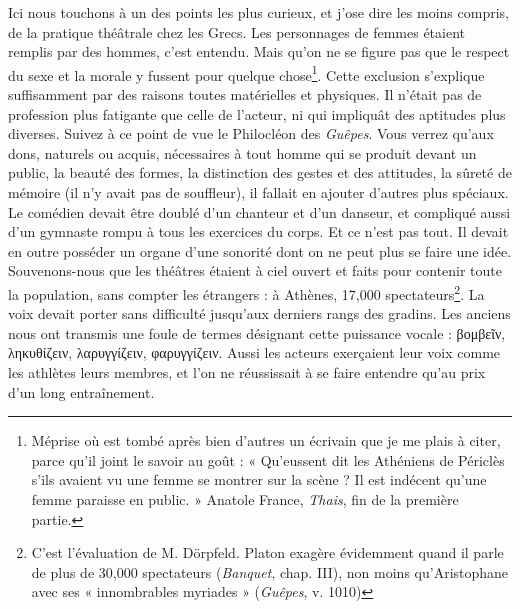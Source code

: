 \documentclass{book}%
\newcommand{\italique}[1]{\textit{#1}}%
\newcommand{\note}[1]{\footnote{#1}}
\begin{document}
Ici nous touchons à un des points les plus curieux, et j'ose dire les moins compris, de la pratique théâtrale chez les Grecs. Les personnages de femmes étaient remplis par des hommes, c'est entendu. Mais qu'on ne se figure pas que le respect du sexe et la morale y fussent pour quelque chose\note{Méprise où est tombé après bien d'autres un écrivain que je me plais à citer, parce qu'il joint le savoir au goût : « Qu'eussent dit les Athéniens de Périclès s'ils avaient vu une femme se montrer sur la scène ? Il est indécent qu'une femme paraisse en public. » Anatole France, \italique{Thais}, fin de la première partie.}. 
Cette exclusion s'explique suffisamment par des raisons toutes matérielles et physiques. Il n'était pas de profession plus fatigante que celle de l'acteur, ni qui impliquât des aptitudes plus diverses. 
Suivez à ce point de vue le Philocléon des \italique{Guêpes}. Vous verrez qu'aux dons, naturels ou acquis, nécessaires à tout homme qui se produit devant un public, la beauté des formes, la distinction des gestes et des attitudes, la sûreté de mémoire (il n'y avait pas de souffleur), il fallait en ajouter d'autres plus spéciaux. 
Le comédien devait être doublé d'un chanteur et d'un danseur, et compliqué aussi d'un gymnaste rompu à tous les exercices du corps. 
Et ce n'est pas tout. Il devait en outre posséder un organe d'une sonorité dont on ne peut plus se faire une idée. Souvenons-nous que les théâtres étaient à ciel ouvert et faits pour contenir toute la population, sans compter les étrangers : à Athènes, 17,000 spectateurs\note{C'est l'évaluation de M. Dörpfeld. Platon exagère évidemment quand il parle de plus de 30,000 spectateurs (\italique{Banquet}, chap. III), non moins qu'Aristophane avec ses « innombrables myriades » (\italique{Guêpes}, v. 1010)}.
La voix devait porter sans difficulté jusqu'aux derniers rangs des gradins. Les anciens nous ont transmis une foule de termes désignant cette puissance vocale : βομβεῖν, ληκυθίζειν, λαρυγγίζειν, φαρυγγίζειν. 
Aussi les acteurs exerçaient leur voix comme les athlètes leurs membres, et l'on ne réussissait à se faire entendre qu'au prix d'un long entraînement. 
\end{document}
